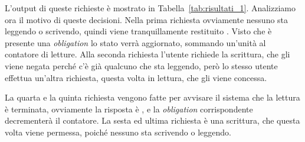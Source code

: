 L'output di queste richieste è mostrato in Tabella~\ref{tab:risultati_1}. Analizziamo ora il motivo di queste decisioni. Nella prima richiesta ovviamente nessuno sta leggendo o scrivendo, quindi viene tranquillamente restituito \permit. Visto che è presente una \textit{obligation} lo stato verrà aggiornato, sommando un'unità al contatore di letture.
Alla seconda richiesta l'utente richiede la scrittura, che gli viene negata perché c'è già qualcuno che sta leggendo, però lo stesso utente effettua un'altra richiesta, questa volta in lettura, che gli viene concessa.\\ \par
La quarta e la quinta richiesta vengono fatte per avvisare il sistema che la lettura è terminata, ovviamente la risposta è \permit, e la \textit{obligation} corrispondente decrementerà il contatore.
La sesta ed ultima richiesta è una scrittura, che questa volta viene permessa, poiché nessuno sta scrivendo o leggendo.
